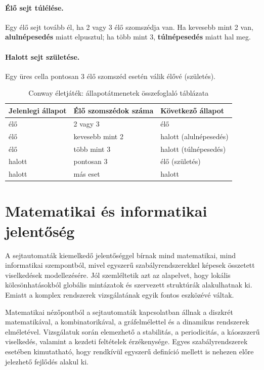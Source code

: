 \documentclass{thesis-ekf}
\begin{document}
\paragraph{Élő sejt túlélése.}
Egy élő sejt tovább él, ha 2 vagy 3 élő szomszédja van. Ha kevesebb mint 2 van, \textbf{alulnépesedés} miatt elpusztul; ha több mint 3, \textbf{túlnépesedés} miatt hal meg.

\paragraph{Halott sejt születése.}
Egy üres cella pontosan 3 élő szomszéd esetén válik élővé (születés).

\begin{table}[htbp]
\centering
\caption{Conway életjáték: állapotátmenetek összefoglaló táblázata}
\begin{tabular}{@{}lll@{}}
\toprule
\textbf{Jelenlegi állapot} & \textbf{Élő szomszédok száma} & \textbf{Következő állapot} \\
\midrule
élő & 2 vagy 3 & élő \\
élő & kevesebb mint 2 & halott (alulnépesedés) \\
élő & több mint 3 & halott (túlnépesedés) \\
halott & pontosan 3 & élő (születés) \\
halott & más eset & halott \\
\bottomrule
\end{tabular}
\end{table}

\section{Matematikai és informatikai jelentőség}
A sejtautomaták kiemelkedő jelentőséggel bírnak mind matematikai, mind informatikai szempontból, mivel egyszerű szabályrendszerekkel képesek összetett viselkedések modellezésére. Jól szemléltetik azt az alapelvet, hogy lokális kölcsönhatásokból globális mintázatok és szervezett struktúrák alakulhatnak ki. Emiatt a komplex rendszerek vizsgálatának egyik fontos eszközévé váltak.

Matematikai nézőpontból a sejtautomaták kapcsolatban állnak a diszkrét matematikával, a kombinatorikával, a gráfelmélettel és a dinamikus rendszerek elméletével. Vizsgálatuk során elemezhető a stabilitás, a periodicitás, a káoszszerű viselkedés, valamint a kezdeti feltételek érzékenysége. Egyes szabályrendszerek esetében kimutatható, hogy rendkívül egyszerű definíció mellett is nehezen előre jelezhető fejlődés alakul ki.
\end{document}
